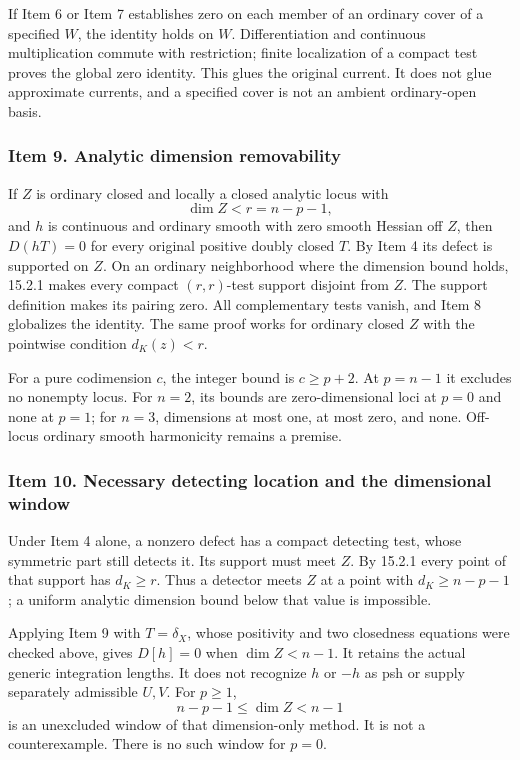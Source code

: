 \documentclass[11pt]{article}
\begin{document}
If Item 6 or Item 7 establishes zero on each member of an ordinary cover of a specified \(W\), the identity holds on \(W\). Differentiation and continuous multiplication commute with restriction; finite localization of a compact test proves the global zero identity. This glues the original current. It does not glue approximate currents, and a specified cover is not an ambient ordinary-open basis.

\subsubsection{Item 9. Analytic dimension removability}

If \(Z\) is ordinary closed and locally a closed analytic locus with
\[
 \dim Z<r=n-p-1,
\]
and \(h\) is continuous and ordinary smooth with zero smooth Hessian off \(Z\), then \(D(hT)=0\) for every original positive doubly closed \(T\). By Item 4 its defect is supported on \(Z\). On an ordinary neighborhood where the dimension bound holds, 15.2.1 makes every compact \((r,r)\)-test support disjoint from \(Z\). The support definition makes its pairing zero. All complementary tests vanish, and Item 8 globalizes the identity. The same proof works for ordinary closed \(Z\) with the pointwise condition \(d_K(z)<r\).

For a pure codimension \(c\), the integer bound is \(c\geq p+2\). At \(p=n-1\) it excludes no nonempty locus. For \(n=2\), its bounds are zero-dimensional loci at \(p=0\) and none at \(p=1\); for \(n=3\), dimensions at most one, at most zero, and none. Off-locus ordinary smooth harmonicity remains a premise.

\subsubsection{Item 10. Necessary detecting location and the dimensional window}

Under Item 4 alone, a nonzero defect has a compact detecting test, whose symmetric part still detects it. Its support must meet \(Z\). By 15.2.1 every point of that support has \(d_K\geq r\). Thus a detector meets \(Z\) at a point with \(d_K\geq n-p-1\); a uniform analytic dimension bound below that value is impossible.

Applying Item 9 with \(T=\delta_X\), whose positivity and two closedness equations were checked above, gives \(D[h]=0\) when \(\dim Z<n-1\). It retains the actual generic integration lengths. It does not recognize \(h\) or \(-h\) as psh or supply separately admissible \(U,V\). For \(p\geq1\),
\[
 n-p-1\leq\dim Z<n-1
\]
is an unexcluded window of that dimension-only method. It is not a counterexample. There is no such window for \(p=0\).
\end{document}
